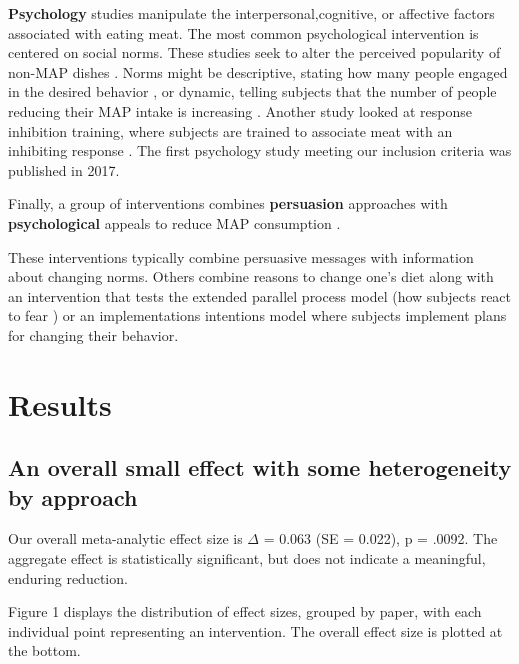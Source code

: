\documentclass[sn-nature,referee,pdflatex]{sn-jnl}
\begin{document}
\textbf{Psychology} studies
\citep{aldoh2023, allen2002, camp2019, coker2022, griesoph2021, piester2020, sparkman2017, sparkman2020}
manipulate the interpersonal,cognitive, or affective factors associated
with eating meat. The most common psychological intervention is centered
on social norms. These studies seek to alter the perceived popularity of
non-MAP dishes \citep{sparkman2017}. Norms might be descriptive, stating
how many people engaged in the desired behavior \citep{aldoh2023}, or
dynamic, telling subjects that the number of people reducing their MAP
intake is increasing
\citep{aldoh2023, coker2022, sparkman2017, sparkman2020}. Another study
looked at response inhibition training, where subjects are trained to
associate meat with an inhibiting response \citep{camp2019}. The first
psychology study meeting our inclusion criteria was published in 2017.

Finally, a group of interventions combines \textbf{persuasion}
approaches with \textbf{psychological} appeals to reduce MAP consumption
\citep{berndsen2005, bertolaso2015, carfora2023, fehrenbach2015, hennessy2016, mattson2020, piester2020, shreedhar2021}.

These interventions typically combine persuasive messages with
information about changing norms. Others combine reasons to change one's
diet along with an intervention that tests the extended parallel process
model (how subjects react to fear \citep{fehrenbach2015}) or an
implementations intentions model \citep{shreedhar2021} where subjects
implement plans for changing their behavior.

\section{Results}\label{sec2}

\subsection{An overall small effect with some heterogeneity by
approach}\label{sec2.1}

Our overall meta-analytic effect size is \(\Delta\) = 0.063 (SE =
0.022), p = .0092. The aggregate effect is statistically significant,
but does not indicate a meaningful, enduring reduction.

Figure 1 displays the distribution of effect sizes, grouped by paper,
with each individual point representing an intervention. The overall
effect size is plotted at the bottom.
\end{document}
